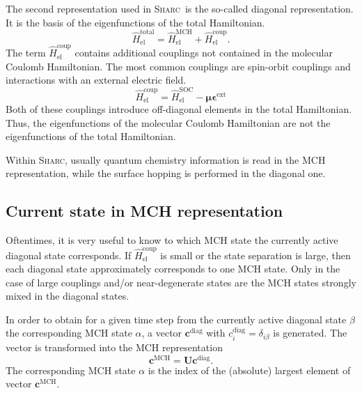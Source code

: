 \documentclass[a4paper,10pt,DIV=15,openany]{scrbook}
\newcommand{\sharc}{\textsc{Sharc}}
\newcommand{\VEC}[1]{\ensuremath{\mathbf{#1}}}
\begin{document}
The second representation used in \sharc\ is the so-called diagonal representation. It is the basis of the eigenfunctions of the total Hamiltonian.
\begin{equation}
  \hat{H}_{\text{el}}^{\text{total}}
  =\hat{H}_{\text{el}}^{\text{MCH}}
  +\hat{H}_{\text{el}}^{\text{coup}}.
\end{equation}
The term $\hat{H}_{\text{el}}^{\text{coup}}$ contains additional couplings not contained in the molecular Coulomb Hamiltonian. The most common couplings are spin-orbit couplings and interactions with an external electric field.
\begin{equation}
  \hat{H}_{\text{el}}^{\text{coup}}=\hat{H}_{\text{el}}^{\text{SOC}}-\boldsymbol{\mu}\boldsymbol{\epsilon}^{\text{ext}}
\end{equation}
Both of these couplings introduce off-diagonal elements in the total Hamiltonian. Thus, the eigenfunctions of the molecular Coulomb Hamiltonian are not the eigenfunctions of the total Hamiltonian. 

Within \sharc, usually quantum chemistry information is read in the MCH representation, while the surface hopping is performed in the diagonal one.

\subsection{Current state in MCH representation}\label{ssec:state_transform}

Oftentimes, it is very useful to know to which MCH state the currently active diagonal state corresponds. If $\hat{H}_{\text{el}}^{\text{coup}}$ is small or the state separation is large, then each diagonal state approximately corresponds to one MCH state. Only in the case of large couplings and/or near-degenerate states are the MCH states strongly mixed in the diagonal states.

In order to obtain for a given time step from the currently active diagonal state $\beta$ the corresponding MCH state $\alpha$, a vector $\VEC{c}^\text{diag}$ with $c_i^\text{diag}=\delta_{i\beta}$ is generated. The vector is transformed into the MCH representation
\begin{equation}
  \VEC{c}^\text{MCH}=\VEC{U}\VEC{c}^\text{diag}.
\end{equation}
The corresponding MCH state $\alpha$ is the index of the (absolute) largest element of vector $\VEC{c}^\text{MCH}$.

\end{document}
